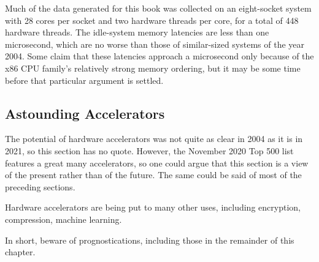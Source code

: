 Much of the data generated for this book was collected on an eight-socket
system with 28 cores per socket and two hardware threads per core, for
a total of 448 hardware threads.
The idle-system memory latencies are less than one microsecond, which
are no worse than those of similar-sized systems of the year 2004.
Some claim that these latencies approach a microsecond only because of
the x86 CPU family's relatively strong memory ordering, but it may be
some time before that particular argument is settled.

\subsection{Astounding Accelerators}
\label{sec:future:Astounding Accelerators}

The potential of hardware accelerators was not quite as clear in 2004
as it is in 2021, so this section has no quote.
However, the November 2020 Top 500 list~\cite{Top500} features a great
many accelerators, so one could argue that this section is a view of
the present rather than of the future.
The same could be said of most of the preceding sections.

Hardware accelerators are being put to many other uses, including
encryption, compression, machine learning.

In short, beware of prognostications, including those in the remainder
of this chapter.
